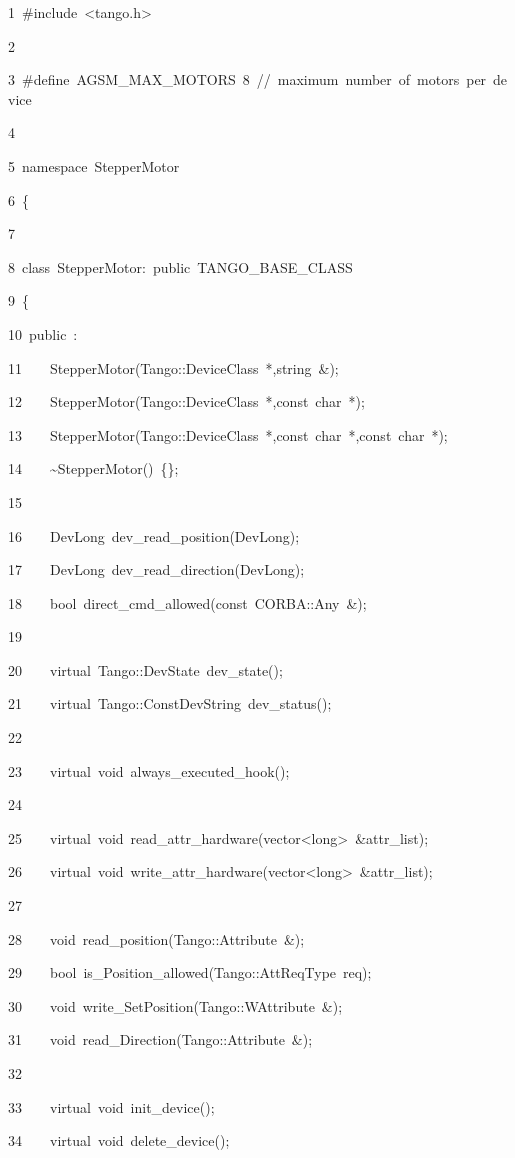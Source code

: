 
\begin{lyxcode}
1~\#include~<tango.h>

2~

3~\#define~AGSM\_MAX\_MOTORS~8~//~maximum~number~of~motors~per~device

4~

5~namespace~StepperMotor

6~\{

7~

8~class~StepperMotor:~public~TANGO\_BASE\_CLASS

9~\{

10~public~:

11~~~~StepperMotor(Tango::DeviceClass~{*},string~\&);

12~~~~StepperMotor(Tango::DeviceClass~{*},const~char~{*});

13~~~~StepperMotor(Tango::DeviceClass~{*},const~char~{*},const~char~{*});

14~~~~\textasciitilde{}StepperMotor()~\{\};

15~

16~~~~DevLong~dev\_read\_position(DevLong);

17~~~~DevLong~dev\_read\_direction(DevLong);

18~~~~bool~direct\_cmd\_allowed(const~CORBA::Any~\&);

19~

20~~~~virtual~Tango::DevState~dev\_state();

21~~~~virtual~Tango::ConstDevString~dev\_status();

22~

23~~~~virtual~void~always\_executed\_hook();

24~

25~~~~virtual~void~read\_attr\_hardware(vector<long>~\&attr\_list);

26~~~~virtual~void~write\_attr\_hardware(vector<long>~\&attr\_list);

27~

28~~~~void~read\_position(Tango::Attribute~\&);

29~~~~bool~is\_Position\_allowed(Tango::AttReqType~req);

30~~~~void~write\_SetPosition(Tango::WAttribute~\&);

31~~~~void~read\_Direction(Tango::Attribute~\&);

32~

33~~~~virtual~void~init\_device();

34~~~~virtual~void~delete\_device();


\end{lyxcode}
